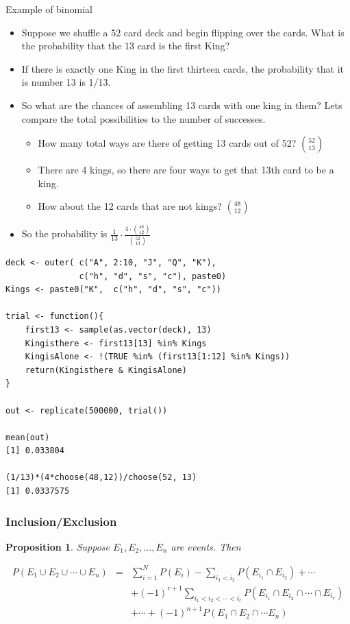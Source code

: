 \documentclass{beamer}
\newtheorem{prop}{Proposition}
\numberwithin{equation}{section}
\begin{document}
\begin{frame}{Example of binomial}
\begin{itemize}
\item Suppose we shuffle a 52 card deck and begin flipping over the cards.  What is the probability that the 13 card is the first King?\pause
\item If there is exactly one King in the first thirteen cards, the probability that it is number 13 is 1/13. \pause
\item So what are the chances of assembling 13 cards with one king in them?  Lets compare the total possibilities to the number of successes.\pause 
\begin{itemize}
\item How many total ways are there of getting 13 cards out of 52? \pause  ${52\choose 13}$\pause
\item There are 4 kings, so there are four ways to get that 13th card to be a king. \pause
\item How about the 12 cards that are not kings?  \pause ${48\choose 12}$
\end{itemize}
\item \pause  So the probability is $\frac{1}{13}\cdot \frac{4\cdot{48\choose 12}}{{52\choose13}}$
\end{itemize}

\end{frame}

\begin{frame}[fragile]
\begin{verbatim}
deck <- outer( c("A", 2:10, "J", "Q", "K"), 
		       c("h", "d", "s", "c"), paste0)
Kings <- paste0("K",  c("h", "d", "s", "c"))

trial <- function(){
	first13 <- sample(as.vector(deck), 13)
	Kingisthere <- first13[13] %in% Kings 
	KingisAlone <- !(TRUE %in% (first13[1:12] %in% Kings))
	return(Kingisthere & KingisAlone)
}

out <- replicate(500000, trial())

mean(out)
[1] 0.033804

(1/13)*(4*choose(48,12))/choose(52, 13)
[1] 0.0337575
\end{verbatim}
\end{frame}


\begin{frame}
\frametitle{Inclusion/Exclusion}

\begin{prop} 
Suppose $E_{1}, E_{2}, \hdots, E_{n}$ are events.  Then 

\begin{eqnarray}
P(E_{1} \cup E_{2} \cup \cdots \cup E_{n} ) & = & \sum_{i=1}^{N} P(E_{i} ) - \sum_{i_{1} <i_{2} } P(E_{i_{1}} \cap E_{i_{2} } )+ \cdots \nonumber \\
& & + (-1)^{r+ 1} \sum_{i_{1}<i_{2} < \cdots< i_{r} } P(E_{i_{1}} \cap E_{i_{2}}\cap \cdots \cap E_{i_{r}} ) \nonumber \\
& & + \cdots + (-1)^{n+1} P(E_{1} \cap E_{2} \cap \cdots E_{n} ) \nonumber 
\end{eqnarray}
\end{prop}

\end{frame}
\end{document}
